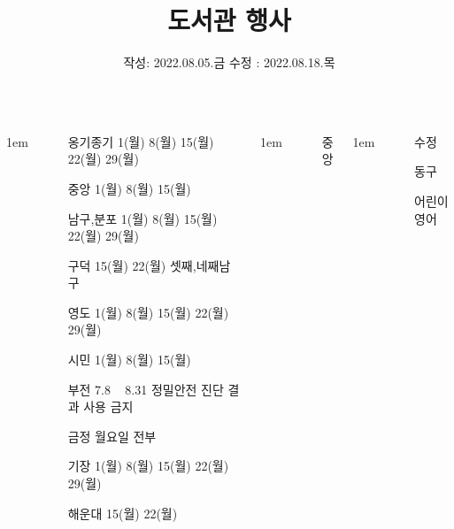 \documentclass[	20pt, 
							a1paper, 
							portrait, %
							margin=0mm, %
							innermargin=10mm,  		%
							blockverticalspace=8mm, %
							colspace=5mm, 
							subcolspace=0mm
							]{tikzposter}
\title{도서관 행사}
\author{ 	작성: 2022.08.05.금 	수정 : 2022.08.18.목 }
\begin{document}
	\maketitle

	\begin{columns}


			{
					\setlength{\leftmargini}{7em}
					\setlength{\labelsep} {1em}
				\begin{LARGE}
					\begin{itemize}
					\item 	[옹기종기] 1(월) 8(월) 15(월) 22(월) 29(월)
					\item 	[중앙]  1(월) 8(월) 15(월)
					\item 	[남구,분포]  1(월) 8(월) 15(월) 22(월) 29(월)
					\item 	[구덕]  15(월) 22(월) 셋째,네째남구
					\item 	[영도]  1(월) 8(월) 15(월) 22(월) 29(월)
					\item 	[시민]  1(월) 8(월) 15(월)
					\item 	[부전] 7.8 ~ 8.31 정밀안전 진단 결과 사용 금지 
					\item 	[금정] 월요일 전부
					\item 	[기장] 1(월) 8(월) 15(월) 22(월) 29(월)
					\item 	[해운대] 15(월) 22(월)
					\end{itemize}
				\end{LARGE}
			}

			{
					\setlength{\leftmargini}{7em}
					\setlength{\labelsep} {1em}
				\begin{LARGE}
					\begin{itemize}
					\item 	[중앙]
					\end{itemize}
				\end{LARGE}
			}

			{
					\setlength{\leftmargini}{9em}
					\setlength{\labelsep} {1em}
				\begin{LARGE}
					\begin{itemize}
					\item 	[수정]
					\item 	[동구]
					\item 	[어린이영어]
					\end{itemize}
				\end{LARGE}
			}


\end{columns}
\end{document}

